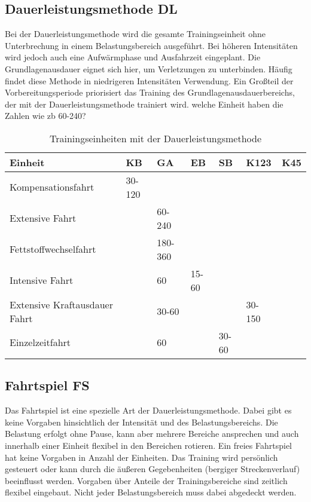 \subsection{Dauerleistungsmethode DL}
Bei der Dauerleistungsmethode wird die gesamte Trainingseinheit ohne Unterbrechung in einem Belastungsbereich ausgeführt. Bei höheren Intensitäten wird jedoch auch eine Aufwärmphase und Ausfahrzeit eingeplant. Die Grundlagenausdauer eignet sich hier, um Verletzungen zu unterbinden. Häufig findet diese Methode in niedrigeren Intensitäten Verwendung. Ein Großteil der Vorbereitungsperiode priorisiert das Training des Grundlagenausdauerbereichs, der mit der Dauerleistungsmethode trainiert wird. welche Einheit haben die Zahlen wie zb 60-240?
\begin{table}[h]
\centering  
    \begin{tabularx}{\textwidth}{|b|ssssss|}
    \hline
    \textbf{Einheit} & \textbf{KB} & \textbf{GA}& \textbf{EB}& \textbf{SB}& \textbf{K123}   &\textbf{K45} \\  \hline
    Kompensationsfahrt                  & 30-120 &         &             &        &        &           \\ \hline
    Extensive Fahrt                     &        & 60-240  &             &        &        &           \\ \hline
    Fettstoffwechselfahrt               &        & 180-360 &             &        &        &           \\ \hline
    Intensive Fahrt                     &        & 60      & 15-60       &        &        &           \\ \hline
    Extensive Kraftausdauer Fahrt       &        & 30-60   &             &        & 30-150 &           \\ \hline
    Einzelzeitfahrt                     &        & 60      &             & 30-60  &        &           \\ \hline
    \end{tabularx}
    \caption{Trainingseinheiten mit der Dauerleistungsmethode}
    \label{table:fahrtspiel}
\end{table}
\subsection{Fahrtspiel FS}
Das Fahrtspiel ist eine spezielle Art der Dauerleistungsmethode. Dabei gibt es keine Vorgaben hinsichtlich der Intensität und des Belastungsbereichs. Die Belastung erfolgt ohne Pause, kann aber mehrere Bereiche ansprechen und auch innerhalb einer Einheit flexibel in den Bereichen rotieren. Ein freies Fahrtspiel hat keine Vorgaben in Anzahl der Einheiten. Das Training wird persönlich gesteuert oder kann durch die äußeren Gegebenheiten (bergiger Streckenverlauf) beeinflusst werden. Vorgaben über Anteile der Trainingsbereiche sind zeitlich flexibel eingebaut. Nicht jeder Belastungsbereich muss dabei abgedeckt werden. 

